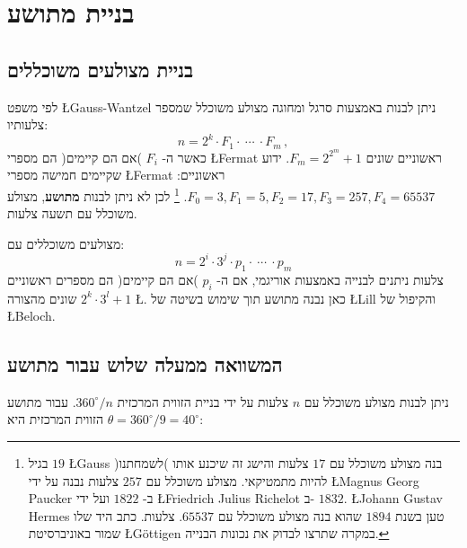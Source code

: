 
\chapter{בניית מתושע}\label{c.nonagon}

\section{בניית מצולעים משוכללים}

לפי משפט
\L{Gauss-Wantzel}
ניתן לבנות באמצעות סרגל ומחוגה מצולע משוכלל שמספר צלעותיו:
\[
n=2^k\cdot F_1 \cdot \:\cdots\: \cdot F_m\,,
\]
כאשר ה-%
$F_i$
)אם הם קיימים( הם מספרי 
\L{Fermat}
ראשוניים שונים 
$F_m=2^{2^m}+1$.
ידוע שקיימים חמישה מספרי 
\L{Fermat}
ראשוניים:
$F_0=3, F_1=5, F_2=17, F_3=257, F_4=65537$.%
\footnote{%
בגיל
$19$ \L{Gauss}
בנה מצולע משוכלל עם 
$17$
צלעות והישג זה שיכנע אותו )לשמחתנו( להיות מתמטיקאי. מצולע משוכלל עם 
$257$
צלעות נבנה על ידי
\L{Magnus Georg Paucker}
ב-%
$1822$
ועל ידי
\L{Friedrich Julius Richelot}
ב-%
$1832$.
\L{Johann Gustav Hermes}
טען בשנת 
$1894$
שהוא בנה מצולע משוכלל עם 
$65537$.
צלעות. כתב היד שלו שמור באוניברסיטת
\L{G\"{o}ttigen}
במקרה שתרצו לבדוק את נכונות הבנייה.%
} 
לכן לא ניתן לבנות
\textbf{מתושע},
מצולע משוכלל עם תשעה צלעות.


מצולעים משוכללים עם:
\[
n=2^i\cdot 3^j \cdot p_1 \cdot \: \cdots\: \cdot p_m
\]
צלעות ניתנים לבנייה באמצעות אוריגמי, אם ה-%
$p_i$
)אם הם קיימים(
הם מספרים ראשוניים שונים מהצורה
$2^k\cdot 3^l+1$
\L{\cite{alperin}}.
כאן נבנה מתושע תוך שימוש בשיטה של
\L{Lill}
והקיפול של
\L{Beloch}.

\section{המשוואה ממעלה שלוש עבור מתושע}

ניתן לבנות מצולע משוכלל עם 
$n$
צלעות על ידי בניית הזווית המרכזית
$360^\circ/n$.
עבור מתושע הזווית המרכזית היא
$\theta=360^\circ/9=40^\circ$:
\begin{center}
\end{center}

